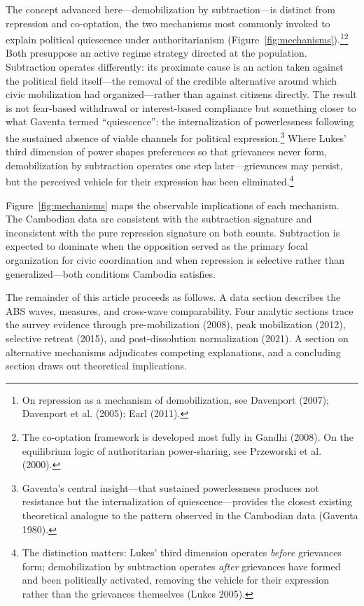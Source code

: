 \documentclass[
  12pt,
  letterpaper]{article}
\begin{document}
The concept advanced here---demobilization by subtraction---is distinct
from repression and co-optation, the two mechanisms most commonly
invoked to explain political quiescence under authoritarianism
(Figure~\ref{fig:mechanisms}).\footnote{On repression as a mechanism of
  demobilization, see Davenport (2007); Davenport et al. (2005); Earl
  (2011).}\footnote{The co-optation framework is developed most fully in
  Gandhi (2008). On the equilibrium logic of authoritarian
  power-sharing, see Przeworski et al. (2000).} Both presuppose an
active regime strategy directed at the population. Subtraction operates
differently: its proximate cause is an action taken against the
political field itself---the removal of the credible alternative around
which civic mobilization had organized---rather than against citizens
directly. The result is not fear-based withdrawal or interest-based
compliance but something closer to what Gaventa termed ``quiescence'':
the internalization of powerlessness following the sustained absence of
viable channels for political expression.\footnote{Gaventa's central
  insight---that sustained powerlessness produces not resistance but the
  internalization of quiescence---provides the closest existing
  theoretical analogue to the pattern observed in the Cambodian data
  (Gaventa 1980).} Where Lukes' third dimension of power shapes
preferences so that grievances never form, demobilization by subtraction
operates one step later---grievances may persist, but the perceived
vehicle for their expression has been eliminated.\footnote{The
  distinction matters: Lukes' third dimension operates \emph{before}
  grievances form; demobilization by subtraction operates \emph{after}
  grievances have formed and been politically activated, removing the
  vehicle for their expression rather than the grievances themselves
  (Lukes 2005).}

Figure~\ref{fig:mechanisms} maps the observable implications of each
mechanism. The Cambodian data are consistent with the subtraction
signature and inconsistent with the pure repression signature on both
counts. Subtraction is expected to dominate when the opposition served
as the primary focal organization for civic coordination and when
repression is selective rather than generalized---both conditions
Cambodia satisfies.

The remainder of this article proceeds as follows. A data section
describes the ABS waves, measures, and cross-wave comparability. Four
analytic sections trace the survey evidence through pre-mobilization
(2008), peak mobilization (2012), selective retreat (2015), and
post-dissolution normalization (2021). A section on alternative
mechanisms adjudicates competing explanations, and a concluding section
draws out theoretical implications.
\end{document}
